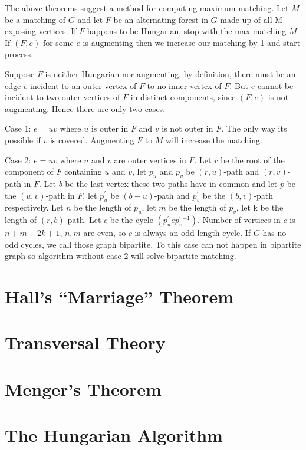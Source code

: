 			The above theorems suggest a method for computing maximum matching. Let $M$ be a matching of $G$ and let $F$ be an alternating forest in $G$ made up of all M-exposing vertices. If $F$ happens to be Hungarian, stop with the max matching $M$. If $(F, e)$ for some $e$ is augmenting then we increase our matching by 1 and start process.

			Suppose $F$ is neither Hungarian nor augmenting, by definition, there must be an edge $e$ incident to an outer vertex of $F$ to no inner vertex of $F$. But $e$ cannot be incident to two outer vertices of $F$ in distinct components, since $(F, e)$ is not augmenting. Hence there are only two cases:

			Case 1: $e=uv$ where $u$ is outer in $F$ and $v$ is not outer in $F$. The only way its possible if $v$ is covered. Augmenting $F$ to $M$ will increase the matching. 

			Case 2: $e=uv$ where $u$ and $v$ are outer vertices in $F$. Let $r$ be the root of the component of $F$ containing $u$ and $v$, let $p_u$ and $p_v$ be $(r,u)$-path and $(r, v)$-path in $F$. Let $b$ be the last vertex these two paths have in common and let $p$ be the $(u, v)$-path in $F$, let $p_u^\prime$ be $(b-u)$-path and $p_v^\prime$ be the $(b,v)$-path respectively. Let $n$ be the length of $p_u$, let $m$ be the length of $p_v$, let k be the length of $(r, b)$-path. Let $c$ be the cycle $(p_u^\prime e p_v^{\prime}^{-1})$. Number of vertices in $c$ is $n + m-2k + 1$, $n, m$ are even, so $c$ is always an odd length cycle. If $G$ has no odd cycles, we call those graph bipartite. To this case can not happen in bipartite graph so algorithm without case 2 will solve bipartite matching.

		\section{Hall's ``Marriage'' Theorem}

		\section{Transversal Theory}

		\section{Menger's Theorem}

		\section{The Hungarian Algorithm}

